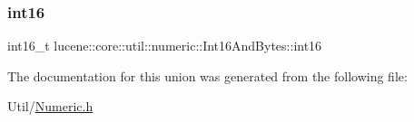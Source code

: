 \subsubsection{\texorpdfstring{int16}{int16}}
{\footnotesize\ttfamily int16\+\_\+t lucene\+::core\+::util\+::numeric\+::\+Int16\+And\+Bytes\+::int16}



The documentation for this union was generated from the following file\+:\begin{DoxyCompactItemize}
\item 
Util/\mbox{\hyperlink{Numeric_8h}{Numeric.\+h}}\end{DoxyCompactItemize}
